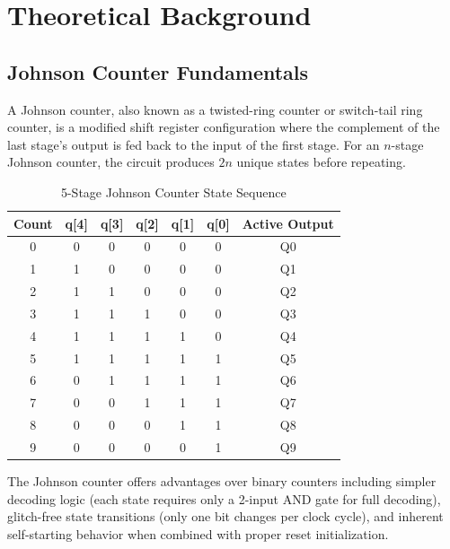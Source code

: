 \documentclass[12pt,a4paper]{report}
\begin{document}
\chapter{Theoretical Background}

\section{Johnson Counter Fundamentals}

A Johnson counter, also known as a twisted-ring counter or switch-tail ring counter, is a modified shift register configuration where the complement of the last stage's output is fed back to the input of the first stage. For an $n$-stage Johnson counter, the circuit produces $2n$ unique states before repeating.

\begin{table}[H]
    \centering
    \caption{5-Stage Johnson Counter State Sequence}
    \label{tab:johnson_states}
    \begin{tabular}{ccccccc}
        \toprule
        \textbf{Count} & \textbf{q[4]} & \textbf{q[3]} & \textbf{q[2]} & \textbf{q[1]} & \textbf{q[0]} & \textbf{Active Output} \\
        \midrule
        0 & 0 & 0 & 0 & 0 & 0 & Q0 \\
        1 & 1 & 0 & 0 & 0 & 0 & Q1 \\
        2 & 1 & 1 & 0 & 0 & 0 & Q2 \\
        3 & 1 & 1 & 1 & 0 & 0 & Q3 \\
        4 & 1 & 1 & 1 & 1 & 0 & Q4 \\
        5 & 1 & 1 & 1 & 1 & 1 & Q5 \\
        6 & 0 & 1 & 1 & 1 & 1 & Q6 \\
        7 & 0 & 0 & 1 & 1 & 1 & Q7 \\
        8 & 0 & 0 & 0 & 1 & 1 & Q8 \\
        9 & 0 & 0 & 0 & 0 & 1 & Q9 \\
        \bottomrule
    \end{tabular}
\end{table}

The Johnson counter offers advantages over binary counters including simpler decoding logic (each state requires only a 2-input AND gate for full decoding), glitch-free state transitions (only one bit changes per clock cycle), and inherent self-starting behavior when combined with proper reset initialization.
\end{document}
